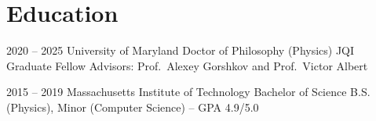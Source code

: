 \section{Education}


\cventry
  {2020 -- 2025}
  {University of Maryland}
  {Doctor of Philosophy (Physics)}
  {JQI Graduate Fellow}
  {}
  {Advisors: Prof.~Alexey Gorshkov and Prof.~Victor Albert}


\cventry
  {2015 -- 2019}
  {Massachusetts Institute of Technology}
  {Bachelor of Science}
  {}
  {}
  {B.S. (Physics), Minor (Computer Science) -- GPA 4.9/5.0}
